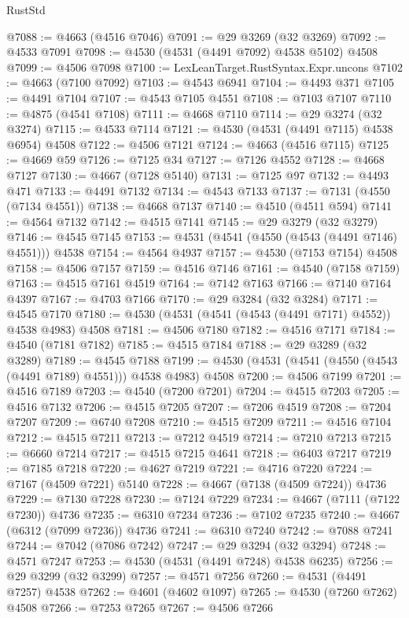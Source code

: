 \begin{lexlean}{RustStd}
\begin{coremodule}
{\begin{coremodule}
{{{{{{{{{{{{{{{{{{{{{{{{{{{{{{{{{{{{{{{{{{{{{{{{{{{{{{{@7088 := @4663 (@4516 @7046)
@7091 := @29 @3269 (@32 @3269)
@7092 := @4533 @7091
@7098 := @4530 (@4531 (@4491 @7092) @4538 @5102) @4508
@7099 := @4506 @7098
@7100 := LexLeanTarget.RustSyntax.Expr.uncons
@7102 := @4663 (@7100 @7092)
@7103 := @4543 @6941
@7104 := @4493 @371
@7105 := @4491 @7104
@7107 := @4543 @7105 @4551
@7108 := @7103 @7107
@7110 := @4875 (@4541 @7108)
@7111 := @4668 @7110
@7114 := @29 @3274 (@32 @3274)
@7115 := @4533 @7114
@7121 := @4530 (@4531 (@4491 @7115) @4538 @6954) @4508
@7122 := @4506 @7121
@7124 := @4663 (@4516 @7115)
@7125 := @4669 @59
@7126 := @7125 @34
@7127 := @7126 @4552
@7128 := @4668 @7127
@7130 := @4667 (@7128 @5140)
@7131 := @7125 @97
@7132 := @4493 @471
@7133 := @4491 @7132
@7134 := @4543 @7133
@7137 := @7131 (@4550 (@7134 @4551))
@7138 := @4668 @7137
@7140 := @4510 (@4511 @594)
@7141 := @4564 @7132
@7142 := @4515 @7141
@7145 := @29 @3279 (@32 @3279)
@7146 := @4545 @7145
@7153 := @4531 (@4541 (@4550 (@4543 (@4491 @7146) @4551))) @4538
@7154 := @4564 @4937
@7157 := @4530 (@7153 @7154) @4508
@7158 := @4506 @7157
@7159 := @4516 @7146
@7161 := @4540 (@7158 @7159)
@7163 := @4515 @7161 @4519
@7164 := @7142 @7163
@7166 := @7140 @7164 @4397
@7167 := @4703 @7166
@7170 := @29 @3284 (@32 @3284)
@7171 := @4545 @7170
@7180 := @4530 (@4531 (@4541 (@4543 (@4491 @7171) @4552)) @4538 @4983) @4508
@7181 := @4506 @7180
@7182 := @4516 @7171
@7184 := @4540 (@7181 @7182)
@7185 := @4515 @7184
@7188 := @29 @3289 (@32 @3289)
@7189 := @4545 @7188
@7199 := @4530 (@4531 (@4541 (@4550 (@4543 (@4491 @7189) @4551))) @4538 @4983) @4508
@7200 := @4506 @7199
@7201 := @4516 @7189
@7203 := @4540 (@7200 @7201)
@7204 := @4515 @7203
@7205 := @4516 @7132
@7206 := @4515 @7205
@7207 := @7206 @4519
@7208 := @7204 @7207
@7209 := @6740 @7208
@7210 := @4515 @7209
@7211 := @4516 @7104
@7212 := @4515 @7211
@7213 := @7212 @4519
@7214 := @7210 @7213
@7215 := @6660 @7214
@7217 := @4515 @7215 @4641
@7218 := @6403 @7217
@7219 := @7185 @7218
@7220 := @4627 @7219
@7221 := @4716 @7220
@7224 := @7167 (@4509 @7221) @5140
@7228 := @4667 (@7138 (@4509 @7224)) @4736
@7229 := @7130 @7228
@7230 := @7124 @7229
@7234 := @4667 (@7111 (@7122 @7230)) @4736
@7235 := @6310 @7234
@7236 := @7102 @7235
@7240 := @4667 (@6312 (@7099 @7236)) @4736
@7241 := @6310 @7240
@7242 := @7088 @7241
@7244 := @7042 (@7086 @7242)
@7247 := @29 @3294 (@32 @3294)
@7248 := @4571 @7247
@7253 := @4530 (@4531 (@4491 @7248) @4538 @6235)
@7256 := @29 @3299 (@32 @3299)
@7257 := @4571 @7256
@7260 := @4531 (@4491 @7257) @4538
@7262 := @4601 (@4602 @1097)
@7265 := @4530 (@7260 @7262) @4508
@7266 := @7253 @7265
@7267 := @4506 @7266
}}}}}}}}}}}}}}}}}}}}}}}}}}}}}}}}}}}}}}}}}}}}}}}}}}}}}}}
\end{coremodule}}
\end{coremodule}
\end{lexlean}
